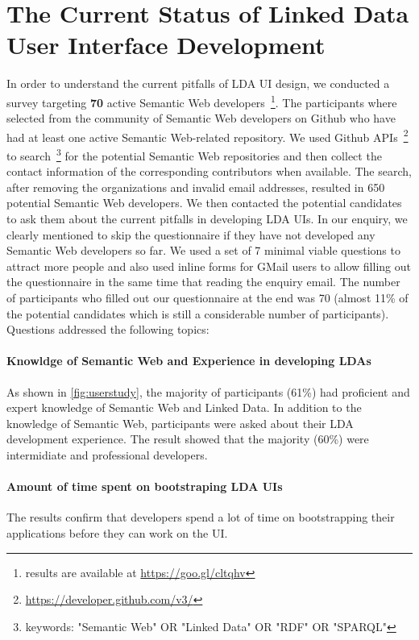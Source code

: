 \documentclass{acm_proc_article-sp}
\begin{document}
\section{The Current Status of Linked Data User Interface Development}
In order to understand the current pitfalls of LDA UI design, we conducted a survey targeting \textbf{70} active Semantic Web developers~\footnote{results are available at \url{https://goo.gl/cltqhv}}.
The participants where selected from the community of Semantic Web developers on Github who have had at least one active Semantic Web-related repository.
We used Github APIs~\footnote{\url{https://developer.github.com/v3/}} to search~\footnote{keywords: "Semantic Web" OR "Linked Data" OR "RDF" OR "SPARQL"} for the potential Semantic Web repositories and then collect the contact information of the corresponding contributors when available.
The search, after removing the organizations and invalid email addresses, resulted in 650 potential Semantic Web developers.
We then contacted the potential candidates to ask them about the current pitfalls in developing LDA UIs.
In our enquiry, we clearly mentioned to skip the questionnaire if they have not developed any Semantic Web developers so far.
We used a set of 7 minimal viable questions to attract more people and also used inline forms for GMail users to allow filling out the questionnaire in the same time that reading the enquiry email.
The number of participants who filled out our questionnaire at the end was 70 (almost 11\% of the potential candidates which is still a considerable number of participants).
Questions addressed the following topics:

\paragraph{Knowldge of Semantic Web and Experience in developing LDAs}
As shown in \autoref{fig:userstudy}, the majority of participants (61\%) had proficient and expert knowledge of Semantic Web and Linked Data.
In addition to the knowledge of Semantic Web, participants were asked about their LDA development experience.
The result showed that the majority (60\%) were intermidiate and professional developers. 

\paragraph{Amount of time spent on bootstraping LDA UIs}
 The results confirm that developers spend a lot of time on bootstrapping their applications before they can work on the UI.
 
\end{document}
